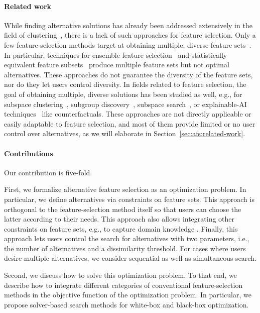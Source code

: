 \documentclass{article}
\theoremstyle{definition}
\begin{document}
\paragraph{Related work}

While finding alternative solutions has already been addressed extensively in the field of clustering~\cite{bailey2014alternative}, there is a lack of such approaches for feature selection.
Only a few feature-selection methods target at obtaining multiple, diverse feature sets~\cite{borboudakis2021extending}.
In particular, techniques for ensemble feature selection~\cite{saeys2008robust, seijo2017ensemble} and statistically equivalent feature subsets~\cite{lagani2017feature} produce multiple feature sets but not optimal alternatives.
These approaches do not guarantee the diversity of the feature sets, nor do they let users control diversity.
In fields related to feature selection, the goal of obtaining multiple, diverse solutions has been studied as well, e.g., for subspace clustering~\cite{hu2018subspace, mueller2009relevant}, subgroup discovery~\cite{leeuwen2012diverse}, subspace search~\cite{trittenbach2019dimension}, or explainable-AI techniques~\cite{artelt2022even, kim2016examples, mothilal2020explaining, russell2019efficient} like counterfactuals.
These approaches are not directly applicable or easily adaptable to feature selection, and most of them provide limited or no user control over alternatives, as we will elaborate in Section~\ref{sec:afs:related-work}.

\paragraph{Contributions}

Our contribution is five-fold.

First, we formalize alternative feature selection as an optimization problem.
In particular, we define alternatives via constraints on feature sets.
This approach is orthogonal to the feature-selection method itself so that users can choose the latter according to their needs.
This approach also allows integrating other constraints on feature sets, e.g., to capture domain knowledge \cite{bach2022empirical, groves2015toward}.
Finally, this approach lets users control the search for alternatives with two parameters, i.e., the number of alternatives and a dissimilarity threshold.
For cases where users desire multiple alternatives, we consider sequential as well as simultaneous search.

Second, we discuss how to solve this optimization problem.
To that end, we describe how to integrate different categories of conventional feature-selection methods in the objective function of the optimization problem.
In particular, we propose solver-based search methods for white-box and black-box optimization.
\end{document}

